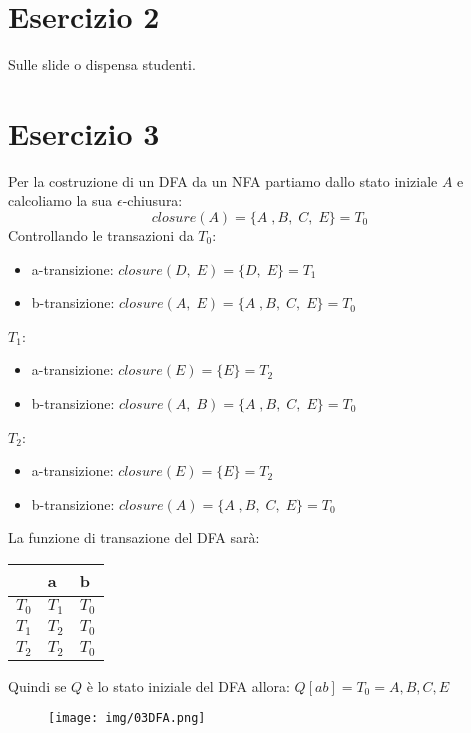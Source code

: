 \documentclass[11pt]{article}
\begin{document}
\section*{Esercizio 2}
Sulle slide o dispensa studenti.
\newpage
\section*{Esercizio 3}
Per la costruzione di un DFA da un NFA partiamo dallo
stato iniziale $A$ e calcoliamo la sua $\epsilon$-chiusura:
$$closure(A) = \{A\;,B,\;C,\;E\} = T_0$$
Controllando le transazioni da $T_0$:
\begin{itemize}
  \item a-transizione: $closure(D,\;E) = \{D,\;E\} = T_1$
  \item b-transizione: $closure(A,\;E) = \{A\;,B,\;C,\;E\} = T_0$
\end{itemize}
$T_1$:
\begin{itemize}
  \item a-transizione: $closure(E) = \{E\} = T_2$
  \item b-transizione: $closure(A,\;B) = \{A\;,B,\;C,\;E\} = T_0$
\end{itemize}
$T_2$:
\begin{itemize}
  \item a-transizione: $closure(E) = \{E\} = T_2$
  \item b-transizione: $closure(A) = \{A\;,B,\;C,\;E\} = T_0$
\end{itemize}
La funzione di transazione del DFA sarà:
\begin{table}[H]
  \centering
  \begin{tabularx}{\textwidth}{|>{\centering\arraybackslash}X|>{\centering\arraybackslash}X|>{\centering\arraybackslash}X|}
  \hline
  & \textbf{a} & \textbf{b}  \\
  \hline
  $T_0$ & $T_1$ & $T_0$\\
  \hline
  $T_1$ & $T_2$ & $T_0$ \\
  \hline
  $T_2$ & $T_2$ & $T_0$ \\
  \hline
  \end{tabularx}
  \label{tab:03-parsing-table}
\end{table}
\noindent Quindi se $Q$ è lo stato iniziale del DFA allora: $Q[ab] = T_0 = {A, B, C, E}$
\begin{figure}[H]
  \centering
  \texttt{[image: img/03DFA.png]}
  \label{fig:03-DFA}
\end{figure} 
\end{document}
